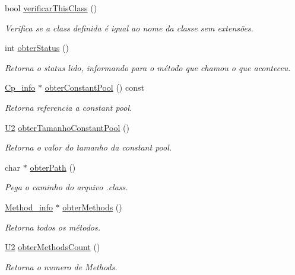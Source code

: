 \begin{DoxyCompactItemize}
bool \hyperlink{classClassFile_a6b8f23db0ee4af80a2e75d46a191dc20}{verificar\+This\+Class} ()
\begin{DoxyCompactList}\small\item\em Verifica se a class definida é igual ao nome da classe sem extensões. \end{DoxyCompactList}\item 
int \hyperlink{classClassFile_a170339cd16cf0afc0567865b3f372d38}{obter\+Status} ()
\begin{DoxyCompactList}\small\item\em Retorna o status lido, informando para o método que chamou o que aconteceu. \end{DoxyCompactList}\item 
\hyperlink{structCp__info}{Cp\+\_\+info} $\ast$ \hyperlink{classClassFile_ab70fe581c4b7a1824adf490c3a53bcc7}{obter\+Constant\+Pool} () const
\begin{DoxyCompactList}\small\item\em Retorna referencia a constant pool. \end{DoxyCompactList}\item 
\hyperlink{BasicTypes_8h_a90240657108b1b457eef9d3f76e0202e}{U2} \hyperlink{classClassFile_a8b60418144c498b9d9545b1784bddf21}{obter\+Tamanho\+Constant\+Pool} ()
\begin{DoxyCompactList}\small\item\em Retorna o valor do tamanho da constant pool. \end{DoxyCompactList}\item 
char $\ast$ \hyperlink{classClassFile_a4803bd3f325fbab1bf9c0f774b3a8c97}{obter\+Path} ()
\begin{DoxyCompactList}\small\item\em Pega o caminho do arquivo .class. \end{DoxyCompactList}\item 
\hyperlink{structMethod__info}{Method\+\_\+info} $\ast$ \hyperlink{classClassFile_a6ecce8d87f74c84b07f102c0298de13a}{obter\+Methods} ()
\begin{DoxyCompactList}\small\item\em Retorna todos os métodos. \end{DoxyCompactList}\item 
\hyperlink{BasicTypes_8h_a90240657108b1b457eef9d3f76e0202e}{U2} \hyperlink{classClassFile_a16409bc8b58eb4965a1e39497cc300d8}{obter\+Methods\+Count} ()
\begin{DoxyCompactList}\small\item\em Retorna o numero de Methods. \end{DoxyCompactList}\item 

\end{DoxyCompactItemize}
